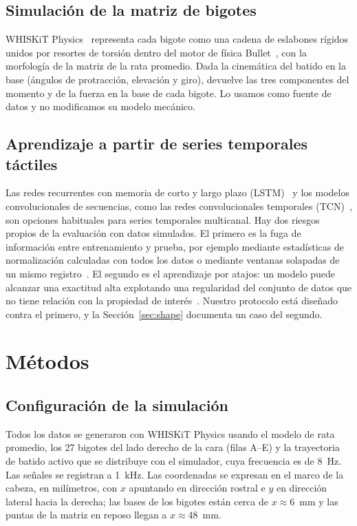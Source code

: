 \documentclass[conference]{IEEEtran}
\begin{document}
\subsection{Simulación de la matriz de bigotes}
WHISKiT Physics~\cite{zweifel2021} representa cada bigote como una cadena de eslabones rígidos unidos por resortes de torsión dentro del motor de física Bullet~\cite{coumans2015}, con la morfología de la matriz de la rata promedio. Dada la cinemática del batido en la base (ángulos de protracción, elevación y giro), devuelve las tres componentes del momento y de la fuerza en la base de cada bigote. Lo usamos como fuente de datos y no modificamos su modelo mecánico.

\subsection{Aprendizaje a partir de series temporales táctiles}
Las redes recurrentes con memoria de corto y largo plazo (LSTM)~\cite{hochreiter1997} y los modelos convolucionales de secuencias, como las redes convolucionales temporales (TCN)~\cite{bai2018}, son opciones habituales para series temporales multicanal. Hay dos riesgos propios de la evaluación con datos simulados. El primero es la fuga de información entre entrenamiento y prueba, por ejemplo mediante estadísticas de normalización calculadas con todos los datos o mediante ventanas solapadas de un mismo registro~\cite{kapoor2023}. El segundo es el aprendizaje por atajos: un modelo puede alcanzar una exactitud alta explotando una regularidad del conjunto de datos que no tiene relación con la propiedad de interés~\cite{geirhos2020}. Nuestro protocolo está diseñado contra el primero, y la Sección~\ref{sec:shape} documenta un caso del segundo.

\section{Métodos}
\subsection{Configuración de la simulación}
Todos los datos se generaron con WHISKiT Physics usando el modelo de rata promedio, los 27 bigotes del lado derecho de la cara (filas A--E) y la trayectoria de batido activo que se distribuye con el simulador, cuya frecuencia es de 8~Hz. Las señales se registran a 1~kHz. Las coordenadas se expresan en el marco de la cabeza, en milímetros, con $x$ apuntando en dirección rostral e $y$ en dirección lateral hacia la derecha; las bases de los bigotes están cerca de $x\approx 6$~mm y las puntas de la matriz en reposo llegan a $x\approx 48$~mm.
\end{document}

